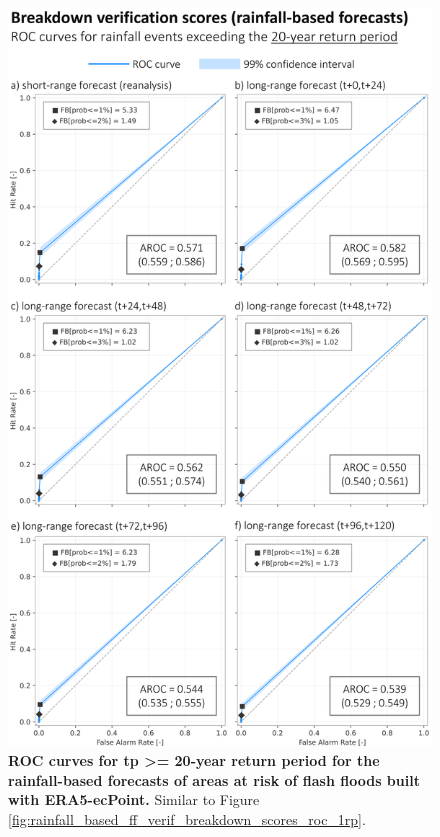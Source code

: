 \begin{figure}[htbp]
\centering
\includegraphics[width=\textwidth]{chapter_05/figures/rainfall_based_ff_verif_breakdown_scores_roc_20rp.png}
\caption{\textbf{ROC curves for tp >= 20-year return period for the rainfall-based forecasts of areas at risk of flash floods built with ERA5-ecPoint.} Similar to Figure \ref{fig:rainfall_based_ff_verif_breakdown_scores_roc_1rp}.}
\label{fig:rainfall_based_ff_verif_breakdown_scores_roc_20rp}
\end{figure}


